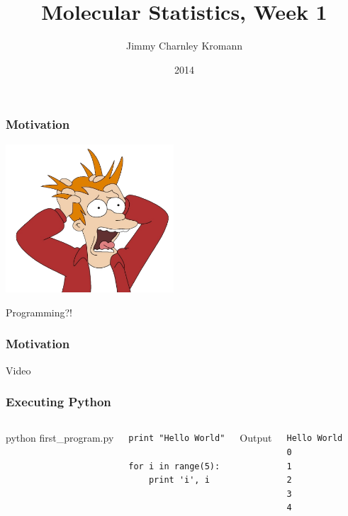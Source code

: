 \documentclass{beamer}
\title[]{Molecular Statistics, Week 1}
\institute[University of Copenhagen]{Department of Chemistry \\ University of Copenhagen}
\author[Jimmy Charnley Kromann]{Jimmy Charnley Kromann}
\date{2014}
\begin{document}
\frame[plain]{\titlepage}


\begin{frame}[fragile]

    \frametitle{Motivation}

    \begin{center}
        \includegraphics[width=0.47\textwidth]{panic.png}

        Programming?!

    \end{center}

\end{frame}


\begin{frame}[fragile]

    \frametitle{Motivation}

    \begin{center}
        Video
    \end{center}

\end{frame}


\begin{frame}[fragile]

    \frametitle{Executing Python}

    \begin{columns}[t]


            \begin{center}
                python first\_program.py
            \end{center}

\begin{lstlisting}
print "Hello World"

for i in range(5):
    print 'i', i
\end{lstlisting}


            \begin{center}
                Output
            \end{center}

\begin{lstlisting}
Hello World
0
1
2
3
4
\end{lstlisting}


    \end{columns}


\end{frame}
\end{document}
